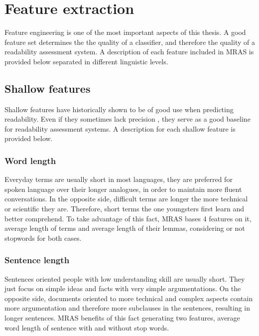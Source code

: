 \documentclass{bsu-ms}
\newcommand{\projectName}{MRAS\xspace}
\begin{document}
\section{Feature extraction}
\label{sec:features}
Feature engineering is one of the most important aspects of this thesis. A good feature set determines the the quality of a classifier, and therefore the quality of a readability assessment system. A description of each feature included in \projectName is provided below separated in different linguistic levels.


\subsection{Shallow features}

Shallow features \cite{flesch1948new,chall1995readability,albright1996readability} have historically shown to be of good use when predicting readability. Even if they sometimes lack precision \cite{davison1982failure}, they serve as a good baseline for readability assessment systems. A description for each shallow feature is provided below.

\subsubsection*{Word length}
Everyday terms are usually short in most languages, they are preferred for spoken language over their longer analogues, in order to maintain more fluent conversations. In the opposite side, difficult terms are longer the more technical or scientific they are. Therefore, short terms the one youngsters first learn and better comprehend. To take advantage of this fact, \projectName bases 4 features on it,  average length of terms and average length of their lemmas, considering or not stopwords for both cases.



\subsubsection*{Sentence length}
Sentences oriented people with low understanding skill are usually short. They just focus on simple ideas and facts with very simple argumentations. On the opposite side, documents oriented to more technical and complex aspects contain more argumentation and therefore more subclauses in the sentences, resulting in longer sentences. \projectName benefits of this fact generating two features, average word length of sentence with and without stop words.
\end{document}
